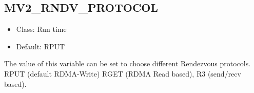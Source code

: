 % 
% 

\subsection{MV2\_RNDV\_PROTOCOL}
\begin{itemize}
    \item Class: Run time
    \item Default: RPUT
\end{itemize}
The value of this variable can be set to choose different Rendezvous
protocols. RPUT (default RDMA-Write) RGET (RDMA Read based), R3
(send/recv based).

